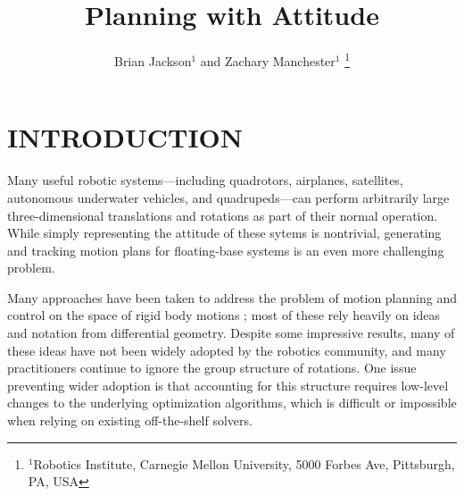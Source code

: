 \documentclass[letterpaper, 10 pt, conference]{ieeeconf}  %
\title{\LARGE \bf
Planning with Attitude
}
\author{Brian Jackson$^1$ and Zachary Manchester$^1$%
    \thanks{
        $^1$Robotics Institute, 
        Carnegie Mellon University, 
        5000 Forbes Ave, Pittsburgh, PA, USA
    }
}
\newcommand{\todo}[1]{\textcolor{red}{TODO: #1}}
\begin{document}
\maketitle


\section{INTRODUCTION} 

    Many useful robotic systems---including quadrotors, airplanes, satellites, autonomous
    underwater vehicles, and quadrupeds---can perform arbitrarily large three-dimensional
    translations and rotations as part of their normal operation. While simply
    representing the attitude of these sytems is nontrivial, generating and tracking
    motion plans for floating-base systems is an even more challenging problem.

    Many approaches have been taken to address the problem of motion planning and control
    on the space of rigid body motions \cite{Kobilarov2011, Saccon2013,
    watterson2020control}; most of these rely heavily on ideas and notation from
    differential geometry. Despite some impressive results, many of these ideas have not
    been widely adopted by the robotics community, and many practitioners continue to
    ignore the group structure of rotations. One issue preventing wider adoption is that
    accounting for this structure requires low-level changes to the underlying
    optimization algorithms, which is difficult or impossible when relying on existing
    off-the-shelf solvers.
    
\end{document}

